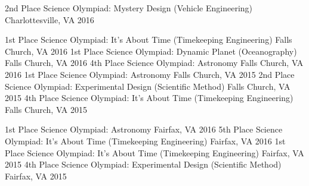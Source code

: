 \begin{cvhonors}
    \cvhonor
    {2nd Place}
    {Science Olympiad: Mystery Design (Vehicle Engineering)}
    {Charlottesville, VA}
    {2016}
\end{cvhonors}
\begin{cvhonors}
  \cvhonor
    {1st Place}
    {Science Olympiad: It's About Time (Timekeeping Engineering)}
    {Falls Church, VA}
    {2016}
    \cvhonor
    {1st Place}
    {Science Olympiad: Dynamic Planet (Oceanography)}
    {Falls Church, VA}
    {2016}
    \cvhonor
    {4th Place}
    {Science Olympiad: Astronomy}
    {Falls Church, VA}
    {2016}
  \cvhonor
    {1st Place}
    {Science Olympiad: Astronomy}
    {Falls Church, VA}
    {2015}
    \cvhonor
    {2nd Place}
    {Science Olympiad: Experimental Design (Scientific Method)}
    {Falls Church, VA}
    {2015}
    \cvhonor
    {4th Place}
    {Science Olympiad: It's About Time (Timekeeping Engineering)}
    {Falls Church, VA}
    {2015}
\end{cvhonors}

\begin{cvhonors}
    \cvhonor
    {1st Place}
    {Science Olympiad: Astronomy}
    {Fairfax, VA}
    {2016}
    \cvhonor
    {5th Place}
    {Science Olympiad: It's About Time (Timekeeping Engineering)}
    {Fairfax, VA}
    {2016}
    \cvhonor
    {1st Place}
    {Science Olympiad: It's About Time (Timekeeping Engineering)}
    {Fairfax, VA}
    {2015}
    \cvhonor
    {4th Place}
    {Science Olympiad: Experimental Design (Scientific Method)}
    {Fairfax, VA}
    {2015}
\end{cvhonors}
